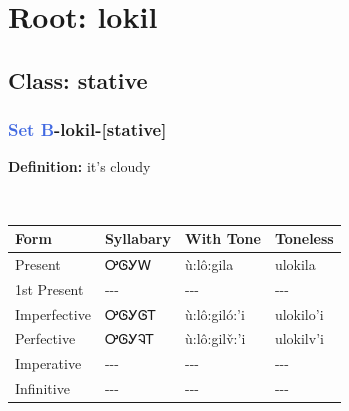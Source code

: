 \needspace{4in}
\section*{Root: lokil}
\nopagebreak
{}
\needspace{3in}
\subsection*{Class: stative}
\nopagebreak
\needspace{2in}
\subsubsection*{\textcolor{RoyalBlue}{Set B}{-}\textbf{lokil}{-}[stative]}
\nopagebreak
\textbf{Definition: } it{\textquoteright}s cloudy
\\[0.5em]
\begin{tabularx}{\textwidth}{l X X X}%
\toprule%
\textbf{Form}&\textbf{Syllabary}&\textbf{With Tone}&\textbf{Toneless}\\%
\midrule%
Present&ᎤᎶᎩᎳ&ù:lô:gila&ulokila\\%
1st Present&{-}{-}{-}&{-}{-}{-}&{-}{-}{-}\\%
Imperfective&ᎤᎶᎩᎶᎢ&ù:lô:giló:’i&ulokilo'i\\%
Perfective&ᎤᎶᎩᎸᎢ&ù:lô:gilv̌:’i&ulokilv'i\\%
Imperative&{-}{-}{-}&{-}{-}{-}&{-}{-}{-}\\%
Infinitive&{-}{-}{-}&{-}{-}{-}&{-}{-}{-}\\%
\bottomrule%
\end{tabularx}
\\[1em]
